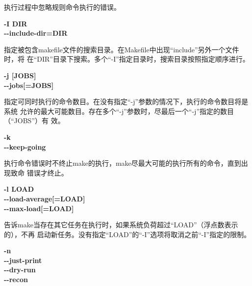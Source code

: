 \begin{dinglist}{47}
执行过程中忽略规则命令执行的错误。

  \item \begin{minipage}[t]{\linewidth}
          \textbf{-I DIR} \\
          \textbf{-{}-include-dir=DIR}
        \end{minipage}

指定被包含makefile文件的搜索目录。在Makefile中出现“include”另外一个文件时，将
在“DIR”目录下搜索。多个“-I”指定目录时，搜索目录按照指定顺序进行。

  \item \begin{minipage}[t]{\linewidth}
          \textbf{-j  [JOBS]} \\
          \textbf{-{}-jobs[=JOBS]}
        \end{minipage}

指定可同时执行的命令数目。在没有指定“-j”参数的情况下，执行的命令数目将是系统
允许的最大可能数目。存在多个“-j”参数时，尽最后一个“-j”指定的数目（“JOBS”）有
效。

  \item \begin{minipage}[t]{\linewidth}
          \textbf{-k} \\
          \textbf{-{}-keep-going}
        \end{minipage}

执行命令错误时不终止make的执行，make尽最大可能的执行所有的命令，直到出现致命
错误才终止。

  \item \begin{minipage}[t]{\linewidth}
          \textbf{-l LOAD} \\
          \textbf{-{}-load-average[=LOAD]}\\
          \textbf{-{}-max-load[=LOAD]}
        \end{minipage}

告诉make当存在其它任务在执行时，如果系统负荷超过“LOAD”（浮点数表示的），不再
启动新任务。没有指定“LOAD”的“-I”选项将取消之前“-I”指定的限制。

  \item \begin{minipage}[t]{\linewidth}
          \textbf{-n} \\
          \textbf{-{}-just-print}\\
          \textbf{-{}-dry-run}\\
          \textbf{-{}-recon}
        \end{minipage}


\end{dinglist}
